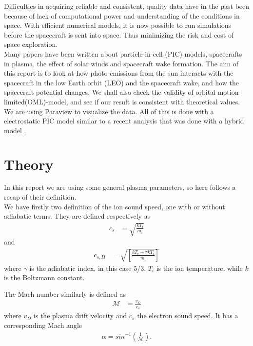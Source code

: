 \documentclass[aip, 
rsi, 
amsmath,
amssymb,
longbibliography,
preprint]{revtex4-1}
\begin{document}
Difficulties in acquiring reliable and consistent, quality data have in the past been because of lack of computational power and understanding of the conditions in space. With efficient numerical models, it is now possible to run simulations before the spacecraft is sent into space. Thus minimizing the risk and cost of space exploration. \\

Many papers have been written about particle-in-cell (PIC) models, spacecrafts in plasma, the effect of solar winds and spacecraft wake formation. The aim of this report is to look at how photo-emissions from the sun interacts with the spacecraft in the low Earth orbit (LEO) and the spacecraft wake, and how the spacecraft potential changes. We shall also check the validity of orbital-motion-limited(OML)-model, and see if our result is consistent with theoretical values. We are using Paraview to visualize the data. All of this is done with a electrostatic PIC model similar to a recent analysis that was done with a hybrid model \cite{P7}.

\section{\label{sec:theory} Theory}

In this report we are using some general plasma parameters, so here follows a recap of their definition.\\

We have firstly two definition of the ion sound speed, one with or without adiabatic terms. They are defined respectively as 
\begin{align}
c_s &= \sqrt{\frac{k T_i}{m_i}}\label{eq:IonSpeed}
\end{align}
and
\begin{align}
c_{s,II} &= \sqrt{\left[ \frac{kT_e + \gamma k T_i}{m_i}\right]}\label{eq:IonSpeed2}
\end{align}
where $\gamma$ is the adiabatic index, in this case 5/3. $T_i$ is the ion temperature, while $k$ is the Boltzmann constant.

The Mach number similarly is defined as
\begin{align}
\mathcal{M} &= \frac{v_D}{c_s}\label{eq:Mach}
\end{align}
where $v_D$ is the plasma drift velocity and $c_s$ the electron sound speed. It has a corresponding Mach angle
\begin{align}
\alpha = sin^{-1}(\frac{1}{\mathcal{M}})\label{eq:MachAngle}.
\end{align}
\end{document}
